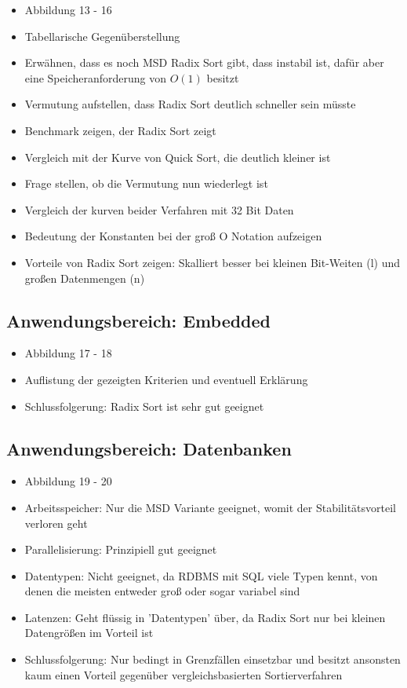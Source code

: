 \documentclass[a4paper, 12pt, oneside]{article}
\begin{document}
    \begin{itemize}
        \item Abbildung 13 - 16
        \item Tabellarische Gegenüberstellung
        \item Erwähnen, dass es noch MSD Radix Sort gibt, dass instabil ist, dafür aber eine Speicheranforderung von $O(1)$ besitzt
        \item Vermutung aufstellen, dass Radix Sort deutlich schneller sein müsste
        \item Benchmark zeigen, der Radix Sort zeigt
        \item Vergleich mit der Kurve von Quick Sort, die deutlich kleiner ist
        \item Frage stellen, ob die Vermutung nun wiederlegt ist
        \item Vergleich der kurven beider Verfahren mit 32 Bit Daten
        \item Bedeutung der Konstanten bei der groß O Notation aufzeigen
        \item Vorteile von Radix Sort zeigen: Skalliert besser bei kleinen Bit-Weiten (l) und großen Datenmengen (n)
    \end{itemize}

    \subsection{Anwendungsbereich: Embedded}

    \begin{itemize}
        \item Abbildung 17 - 18
        \item Auflistung der gezeigten Kriterien und eventuell Erklärung
        \item Schlussfolgerung: Radix Sort ist sehr gut geeignet
    \end{itemize}

    \subsection{Anwendungsbereich: Datenbanken}

    \begin{itemize}
        \item Abbildung 19 - 20
        \item Arbeitsspeicher: Nur die MSD Variante geeignet, womit der Stabilitätsvorteil verloren geht
        \item Parallelisierung: Prinzipiell gut geeignet
        \item Datentypen: Nicht geeignet, da RDBMS mit SQL viele Typen kennt, von denen die meisten entweder groß oder sogar variabel sind
        \item Latenzen: Geht flüssig in 'Datentypen' über, da Radix Sort nur bei kleinen Datengrößen im Vorteil ist
        \item Schlussfolgerung: Nur bedingt in Grenzfällen einsetzbar und besitzt ansonsten kaum einen Vorteil gegenüber vergleichsbasierten Sortierverfahren
    \end{itemize}
\end{document}
